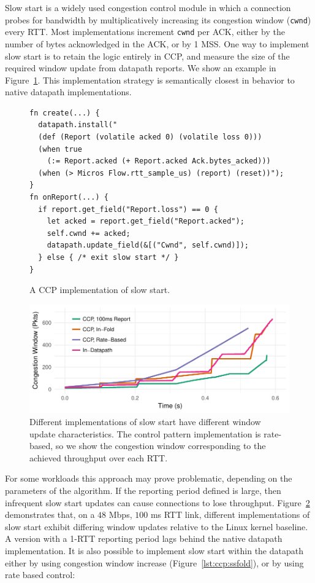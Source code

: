 Slow start is a widely used congestion control module in which a connection probes for bandwidth by multiplicatively increasing its congestion window (\texttt{cwnd}) every RTT. Most implementations increment \texttt{cwnd} per ACK, either by the number of bytes acknowledged in the ACK, or by 1 MSS. One way to implement slow start is to retain the logic entirely in CCP, and measure the size of the required window update from datapath reports. We show an example in Figure~\ref{lst:ccp:ss}. This implementation strategy is semantically closest in behavior to native datapath implementations.

\begin{figure}[t]
{\footnotesize
\begin{verbatim}
fn create(...) {
  datapath.install("
  (def (Report (volatile acked 0) (volatile loss 0)))
  (when true 
    (:= Report.acked (+ Report.acked Ack.bytes_acked)))
  (when (> Micros Flow.rtt_sample_us) (report) (reset))");
}
fn onReport(...) {
  if report.get_field("Report.loss") == 0 {
    let acked = report.get_field("Report.acked");
    self.cwnd += acked;
    datapath.update_field(&[("Cwnd", self.cwnd)]);
  } else { /* exit slow start */ }
}
\end{verbatim}
}
\vspace{-10pt}
\caption{A CCP implementation of slow start.} \label{lst:ccp:ss}
\vspace{-15pt}
\end{figure}

\begin{figure}
    \centering
    \includegraphics[width=\columnwidth]{img/ss-evo}
    \caption{Different implementations of slow start have different window update characteristics. The control pattern implementation is rate-based, so we show the congestion window corresponding to the achieved throughput over each RTT.}
    \label{fig:ccp:ss}
\end{figure}

For some workloads this approach may prove problematic, depending on the parameters of the algorithm. If the reporting period defined is large, then infrequent slow start updates can cause connections to lose throughput.
Figure~\ref{fig:ccp:ss} demonstrates that, on a $48$ Mbps, $100$ ms RTT link, different implementations of slow start exhibit differing window updates relative to the Linux kernel baseline.
A version with a 1-RTT reporting period lags behind the native datapath implementation. It is also possible to implement slow start within the datapath either by using congestion window increase (Figure~\ref{lst:ccp:ssfold}), or by using rate based control: 

